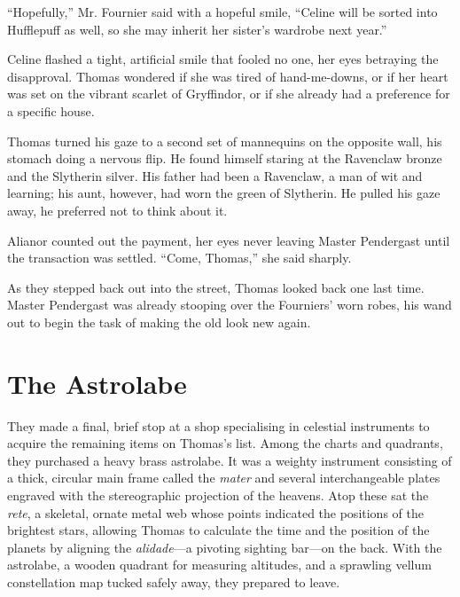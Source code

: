 \enquote{Hopefully,} Mr. Fournier said with a hopeful smile, \enquote{Celine will be sorted into Hufflepuff as well, so she may inherit her sister's wardrobe next year.}

Celine flashed a tight, artificial smile that fooled no one, her eyes betraying the disapproval. Thomas wondered if she was tired of hand-me-downs, or if her heart was set on the vibrant scarlet of Gryffindor, or if she already had a preference for a specific house.

Thomas turned his gaze to a second set of mannequins on the opposite wall, his stomach doing a nervous flip. He found himself staring at the Ravenclaw bronze and the Slytherin silver. His father had been a Ravenclaw, a man of wit and learning; his aunt, however, had worn the green of Slytherin. He pulled his gaze away, he preferred not to think about it.

Alianor counted out the payment, her eyes never leaving Master Pendergast until the transaction was settled. \enquote{Come, Thomas,} she said sharply.

As they stepped back out into the street, Thomas looked back one last time. Master Pendergast was already stooping over the Fourniers' worn robes, his wand out to begin the task of making the old look new again.

\section*{The Astrolabe}

They made a final, brief stop at a shop specialising in celestial instruments to acquire the remaining items on Thomas's list. Among the charts and quadrants, they purchased a heavy brass astrolabe. It was a weighty instrument consisting of a thick, circular main frame called the \textit{mater} and several interchangeable plates engraved with the stereographic projection of the heavens. Atop these sat the \textit{rete}, a skeletal, ornate metal web whose points indicated the positions of the brightest stars, allowing Thomas to calculate the time and the position of the planets by aligning the \textit{alidade}---a pivoting sighting bar---on the back. With the astrolabe, a wooden quadrant for measuring altitudes, and a sprawling vellum constellation map tucked safely away, they prepared to leave.